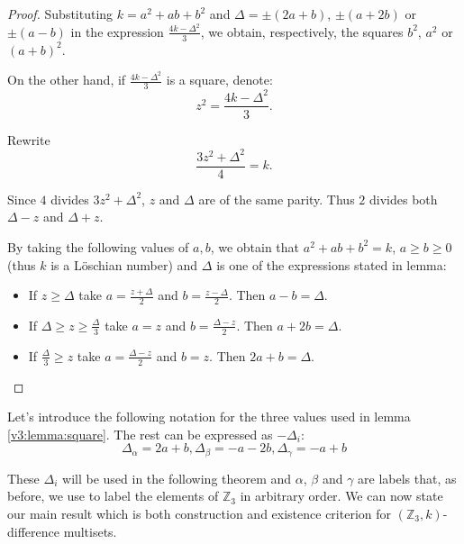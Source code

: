     \begin{proof}
        Substituting $k=a^2+ab+b^2$ and $\Delta=\pm (2a+b)$, $\pm (a+2b)$ or $\pm (a-b)$ in the expression $\frac{4k-\Delta^2}{3}$, we obtain, respectively, the squares $b^2$, $a^2$ or $(a+b)^2$.
        
        On the other hand, if $\frac{4k-\Delta^2}{3}$ is a square, denote:
        \begin{equation}
            z^2 = \frac{4k-\Delta^2}{3}.
        \end{equation}
        
        Rewrite
        \begin{equation}
            \frac{3z^2 + \Delta^2}{4} = k.
        \end{equation}
        
        Since $4$ divides $3z^2 + \Delta^2$, $z$ and $\Delta$ are of the same parity. Thus $2$ divides both $\Delta-z$ and $\Delta+z$.
        
        By taking the following values of $a,b$, we obtain that $a^2+ab+b^2=k$, $a \geq b \geq 0$ (thus $k$ is a Löschian number) and $\Delta$ is one of the expressions stated in lemma:
        
        \begin{itemize}
            \item If $z \geq \Delta$ take $a=\frac{z+\Delta}{2}$ and $b=\frac{z-\Delta}{2}$. Then $a-b=\Delta$.
            \item If $\Delta \geq z \geq \frac \Delta 3$ take $a=z$ and $b=\frac{\Delta-z}{2}$. Then $a+2b=\Delta$.
            \item If $\frac \Delta 3 \geq z$ take $a=\frac{\Delta-z}{2}$ and $b=z$. Then $2a+b=\Delta$.
        \end{itemize}
    \end{proof}

    Let's introduce the following notation for the three values used in lemma \ref{v3:lemma:square}. The rest can be expressed as $-\Delta_i$:
    \begin{equation}
        \label{v3:eq:deltas}
        \Delta_\alpha = 2a+b, \Delta_\beta = -a-2b, \Delta_\gamma = -a+b
    \end{equation}

    These $\Delta_i$ will be used in the following theorem and $\alpha$, $\beta$ and $\gamma$ are labels that, as before, we use to label the elements of $\mathbb Z_3$ in arbitrary order. We can now state our main result which is both construction and existence criterion for $(\mathbb Z_3,k)$-difference multisets.

